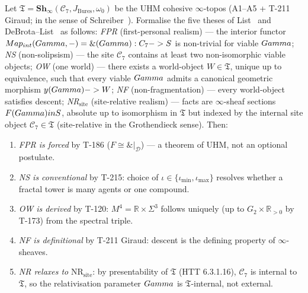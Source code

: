 \begin{theorembox}
\label{thm:t221-categorical-monistic}
Let $\mathfrak T = \mathbf{Sh}_\infty(\mathcal C_7, J_{\mathrm{Bures}},
\omega_0)$ be the UHM cohesive $\infty$-topos (A1--A5 + T-211~
Giraud; in the sense of Schreiber~\cite{schreiber2013}). Formalise the five theses of List~\citep{list2025quadrilemma}
and DeBrota--List~\citep{debrota2026heptalemma,debrotalist2026preprint}
as follows: \emph{FPR} (first-personal realism) --- the interior
functor $Map_{int}(Gamma,-) = \&(Gamma) :
C_7 -> S$ is non-trivial for viable $Gamma$;
\emph{NS} (non-solipsism) --- the site $\mathcal C_7$ contains at
least two non-isomorphic viable objects; \emph{OW} (one world) ---
there exists a world-object $W \in \mathfrak T$, unique up to
equivalence, such that every viable $Gamma$ admits a canonical
geometric morphism $y(Gamma) -> W$; \emph{NF}
(non-fragmentation) --- every world-object satisfies descent;
\emph{NR}$_{\mathrm{site}}$ (site-relative realism) --- facts are
$\infty$-sheaf sections $F(Gamma) in S$, absolute up
to isomorphism in $\mathfrak T$ but indexed by the internal site
object $\mathcal C_7 \in \mathfrak T$ (site-relative in the
Grothendieck sense). Then:

\begin{enumerate}[label=(\roman*),nosep]
  \item \emph{FPR is forced} by T-186 ($F \cong \&|_{\mathcal D}$) ---
        a theorem of UHM, not an optional postulate.
  \item \emph{NS is conventional} by T-215: choice of
        $\iota \in \{\iota_{\min}, \iota_{\max}\}$ resolves whether a
        fractal tower is many agents or one compound.
  \item \emph{OW is derived} by T-120: $M^4 = \mathbb R \times \Sigma^3$
        follows uniquely (up to $G_2 \times \mathbb R_{>0}$ by T-173)
        from the spectral triple.
  \item \emph{NF is definitional} by T-211 Giraud: descent is the
        defining property of $\infty$-sheaves.
  \item \emph{NR relaxes to} NR$_{\mathrm{site}}$: by presentability
        of $\mathfrak T$ (HTT 6.3.1.16), $\mathcal C_7$ is internal to
        $\mathfrak T$, so the relativisation parameter $Gamma$ is
        $\mathfrak T$-internal, not external.
\end{enumerate}


\end{theorembox}
